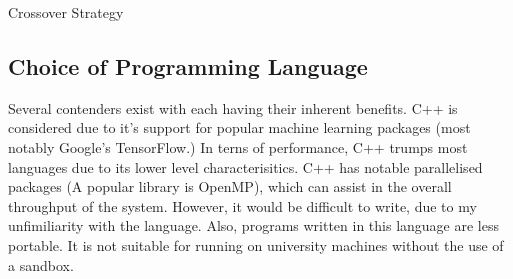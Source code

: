 \documentclass[12pt,a4paper]{article}
\makeatletter
\def\BState{\State\hskip-\ALG@thistlm}
\makeatother
\begin{document}
    \begin{algorithm}
        \caption{Crossover Strategy\label{crossover}}
    \end{algorithm}


\subsection*{Choice of Programming Language}

    Several contenders exist with each having their inherent benefits. C++ is considered due to it's support for popular machine learning packages (most notably Google's TensorFlow.) In terns of performance, C++ trumps most languages due to its lower level characterisitics. C++ has notable parallelised packages (A popular library is OpenMP), which can assist in the overall throughput of the system. However, it would be difficult to write, due to my unfimiliarity with the language. Also, programs written in this language are less portable. It is not suitable for running on university machines without the use of a sandbox.
\end{document}
